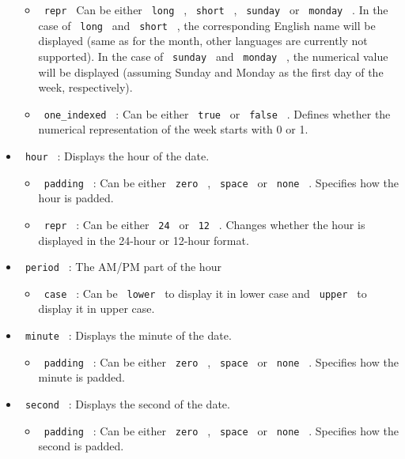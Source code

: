 \begin{itemize}
  \begin{itemize}
  \tightlist
  \item
    \texttt{\ repr\ } Can be either \texttt{\ long\ } ,
    \texttt{\ short\ } , \texttt{\ sunday\ } or \texttt{\ monday\ } . In
    the case of \texttt{\ long\ } and \texttt{\ short\ } , the
    corresponding English name will be displayed (same as for the month,
    other languages are currently not supported). In the case of
    \texttt{\ sunday\ } and \texttt{\ monday\ } , the numerical value
    will be displayed (assuming Sunday and Monday as the first day of
    the week, respectively).
  \item
    \texttt{\ one\_indexed\ } : Can be either \texttt{\ true\ } or
    \texttt{\ false\ } . Defines whether the numerical representation of
    the week starts with 0 or 1.
  \end{itemize}
\item
  \texttt{\ hour\ } : Displays the hour of the date.

  \begin{itemize}
  \tightlist
  \item
    \texttt{\ padding\ } : Can be either \texttt{\ zero\ } ,
    \texttt{\ space\ } or \texttt{\ none\ } . Specifies how the hour is
    padded.
  \item
    \texttt{\ repr\ } : Can be either \texttt{\ 24\ } or \texttt{\ 12\ }
    . Changes whether the hour is displayed in the 24-hour or 12-hour
    format.
  \end{itemize}
\item
  \texttt{\ period\ } : The AM/PM part of the hour

  \begin{itemize}
  \tightlist
  \item
    \texttt{\ case\ } : Can be \texttt{\ lower\ } to display it in lower
    case and \texttt{\ upper\ } to display it in upper case.
  \end{itemize}
\item
  \texttt{\ minute\ } : Displays the minute of the date.

  \begin{itemize}
  \tightlist
  \item
    \texttt{\ padding\ } : Can be either \texttt{\ zero\ } ,
    \texttt{\ space\ } or \texttt{\ none\ } . Specifies how the minute
    is padded.
  \end{itemize}
\item
  \texttt{\ second\ } : Displays the second of the date.

  \begin{itemize}
  \tightlist
  \item
    \texttt{\ padding\ } : Can be either \texttt{\ zero\ } ,
    \texttt{\ space\ } or \texttt{\ none\ } . Specifies how the second
    is padded.
  \end{itemize}
\end{itemize}

